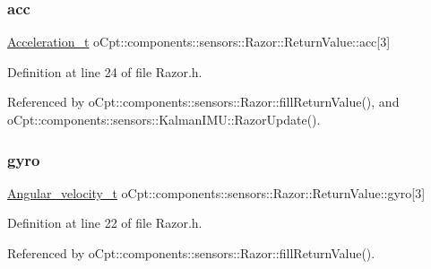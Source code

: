 \subsubsection{\texorpdfstring{acc}{acc}}
{\footnotesize\ttfamily \hyperlink{classo_cpt_1_1components_1_1sensors_1_1_razor_a4ebbe9ca2661c07f9665a32a7dd38e0c}{Acceleration\+\_\+t} o\+Cpt\+::components\+::sensors\+::\+Razor\+::\+Return\+Value\+::acc\mbox{[}3\mbox{]}}



Definition at line 24 of file Razor.\+h.



Referenced by o\+Cpt\+::components\+::sensors\+::\+Razor\+::fill\+Return\+Value(), and o\+Cpt\+::components\+::sensors\+::\+Kalman\+I\+M\+U\+::\+Razor\+Update().

\hypertarget{structo_cpt_1_1components_1_1sensors_1_1_razor_1_1_return_value_a4f6fb4d2ff69d6d41c988ef296398768}{}\label{structo_cpt_1_1components_1_1sensors_1_1_razor_1_1_return_value_a4f6fb4d2ff69d6d41c988ef296398768} 
\subsubsection{\texorpdfstring{gyro}{gyro}}
{\footnotesize\ttfamily \hyperlink{classo_cpt_1_1components_1_1sensors_1_1_razor_a2667055c5eda244f9dd5235159d86184}{Angular\+\_\+velocity\+\_\+t} o\+Cpt\+::components\+::sensors\+::\+Razor\+::\+Return\+Value\+::gyro\mbox{[}3\mbox{]}}



Definition at line 22 of file Razor.\+h.



Referenced by o\+Cpt\+::components\+::sensors\+::\+Razor\+::fill\+Return\+Value().

\hypertarget{structo_cpt_1_1components_1_1sensors_1_1_razor_1_1_return_value_a6f99ff2804c95957a727a47e56f57a2d}{}\label{structo_cpt_1_1components_1_1sensors_1_1_razor_1_1_return_value_a6f99ff2804c95957a727a47e56f57a2d} 
